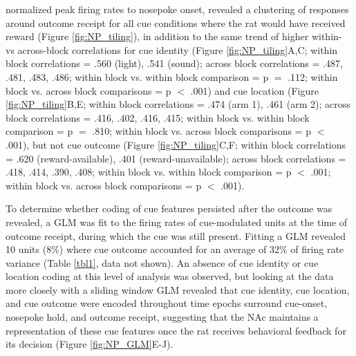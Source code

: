 \documentclass[11pt]{article}
\providecommand{\DIFadd}[1]{{\protect\color{blue}\uwave{#1}}} %
\providecommand{\DIFaddbegin}{} %
\providecommand{\DIFaddend}{} %
\newcommand{\DIFaddincludegraphics}[2][]{{\color{blue}\fbox{\DIFOincludegraphics[#1]{#2}}}} %
\DeclareRobustCommand{\DIFaddbegin}{\DIFOaddbegin \let\includegraphics\DIFaddincludegraphics} %
\DeclareRobustCommand{\DIFaddend}{\DIFOaddend \let\includegraphics\DIFOincludegraphics} %
\begin{document}
\DIFadd{Aligning }\DIFaddend normalized peak firing rates to nosepoke onset, revealed a clustering of responses around outcome receipt for all cue conditions where the rat would have received reward (Figure \ref{fig:NP_tiling}), in addition to the same trend of higher within- vs across-block correlations for cue identity (Figure \ref{fig:NP_tiling}A,C; within block correlations = .560 (light), .541 (sound); across block correlations = .487, .481, .483, .486; within block vs. within block comparison = p $=$ .112; within block vs. across block comparisons = p $<$ .001) and cue location (Figure \ref{fig:NP_tiling}B,E; within block correlations = .474 (arm 1), .461 (arm 2); across block correlations = .416, .402, .416, .415; within block vs. within block comparison = p $=$ .810; within block vs. across block comparisons = p $<$ .001), but not cue outcome (Figure \ref{fig:NP_tiling}C,F; within block correlations = .620 (reward-available), .401 (reward-unavailable); across block correlations = .418, .414, .390, .408; within block vs. within block comparison = p $<$ .001; within block vs. across block comparisons = p $<$ .001). 
\DIFaddbegin 

\DIFaddend To determine whether coding of cue features persisted after the outcome was revealed, a GLM was fit to the firing rates of cue-modulated units at the time of outcome receipt, during which the cue was still present. Fitting a GLM revealed 10 units (8\%) where cue outcome accounted for an average of 32\% of firing rate variance (Table \ref{tbl1}, data not shown). An absence of cue identity or cue location coding at this level of analysis was observed, but looking at the data more closely with a sliding window GLM revealed that cue identity, cue location, and cue outcome were encoded throughout time epochs surround cue-onset, nosepoke hold, and outcome receipt, suggesting that the NAc maintains a representation of these cue features once the rat receives behavioral feedback for its decision (Figure \ref{fig:NP_GLM}E-J).
\end{document}
